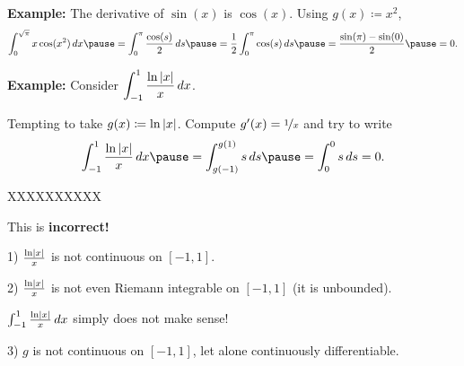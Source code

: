 \documentclass[10pt,aspectratio=149]{beamer}
\begin{document}
\begin{frame}

\textbf{Example:}
The derivative of $\sin(x)$ is $\cos(x)$.
\pause
Using $g(x) \coloneqq x^2$,
\pause
\begin{equation*}
\int_0^{\sqrt{\pi}} x \cos(x^2) \, dx
\pause
= \int_0^\pi \frac{\cos(s)}{2} \, ds
\pause
=
\frac{1}{2}
\int_0^\pi \cos(s) \, ds
\pause
=
\frac{
\sin(\pi) - \sin(0)
}{2}
\pause
=
0 .
\end{equation*}

\pause
\medskip

\textbf{Example:}
Consider
\quad
$\displaystyle
\int_{-1}^{1} \frac{\ln \left\lvert {x} \right\rvert}{x} \,dx$.

\pause
\medskip

Tempting to take $g(x) \coloneqq \ln \left\lvert {x} \right\rvert$.
\pause
Compute $g'(x) =
\nicefrac{1}{x}$ and try to write
\begin{equation*}
\int_{-1}^{1} \frac{\ln \abs{x}}{x} \,dx
\pause
=
\int_{g(-1)}^{g(1)} s \,ds
\pause
= 
\int_{0}^{0} s \,ds = 0. 
\end{equation*}
\pause
\vspace*{-42pt}
\begin{center}
{\color{red}
\Huge XXXXXXXXXX
}
\end{center}
This is \textbf{incorrect!}

\pause
\medskip

1) $\frac{\ln \left\lvert {x} \right\rvert}{x}$ is not continuous on $[-1,1]$.

\pause
\medskip

2) $\frac{\ln \left\lvert {x} \right\rvert}{x}$ is not even Riemann integrable on $[-1,1]$
(it is unbounded).

\pause
\medskip

$\int_{-1}^{1} \frac{\ln \left\lvert {x} \right\rvert}{x} \,dx$
simply does not make sense!

\pause
\medskip

3) $g$ is not continuous on $[-1,1]$, let alone continuously differentiable.

\end{frame}
\end{document}
